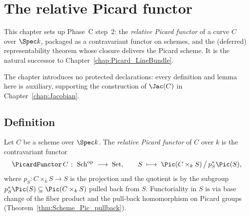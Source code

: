 \chapter{The relative Picard functor}
\label{chap:Picard_Functor}

This chapter sets up Phase~C step~2: the \emph{relative Picard functor} of a curve $C$ over $\Spec k$, packaged as a contravariant functor on schemes, and the (deferred) representability theorem whose closure delivers the Picard scheme. It is the natural successor to Chapter~\ref{chap:Picard_LineBundle}.

The chapter introduces no protected declarations: every definition and lemma here is auxiliary, supporting the construction of $\Jac(C)$ in Chapter~\ref{chap:Jacobian}.

\section{Definition}

\begin{definition}
  \label{def:Pic_functor}
  \leanok
  Let $C$ be a scheme over $\Spec k$. The \emph{relative Picard functor} of $C$ over $k$ is the contravariant functor
  \[
    \PicardFunctor\, C \;\colon\; \mathrm{Sch}^{\mathrm{op}} \;\longrightarrow\; \mathrm{Set},\qquad
    S \;\longmapsto\; \Pic(C \times_k S) \,\big/\, p_S^* \Pic(S),
  \]
  where $p_S \colon C \times_k S \to S$ is the projection and the quotient is by the subgroup $p_S^*\Pic(S) \subseteq \Pic(C \times_k S)$ pulled back from $S$. Functoriality in $S$ is via base change of the fiber product and the pull-back homomorphism on Picard groups (Theorem~\ref{thm:Scheme_Pic_pullback}).
\end{definition}

